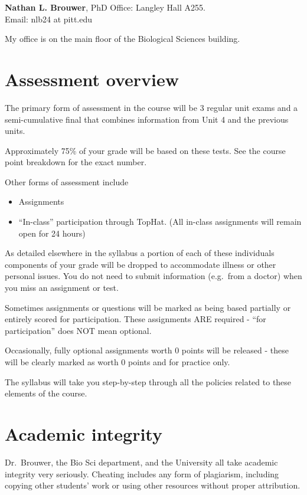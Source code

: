 \documentclass[
]{book}
\providecommand{\tightlist}{%
  \setlength{\itemsep}{0pt}\setlength{\parskip}{0pt}}
\begin{document}
\textbf{Nathan L. Brouwer}, PhD
Office: Langley Hall A255.\\
Email: nlb24 at pitt.edu

My office is on the main floor of the Biological Sciences building.

\hypertarget{assessment-overview}{%
\chapter{Assessment overview}\label{assessment-overview}}

The primary form of assessment in the course will be 3 regular unit exams and a semi-cumulative final that combines information from Unit 4 and the previous units.

Approximately 75\% of your grade will be based on these tests. See the course point breakdown for the exact number.

Other forms of assessment include

\begin{itemize}
\tightlist
\item
  Assignments
\item
  ``In-class'' participation through TopHat. (All in-class assignments will remain open for 24 hours)
\end{itemize}

As detailed elsewhere in the syllabus a portion of each of these individuals components of your grade will be dropped to accommodate illness or other personal issues. You do not need to submit information (e.g.~from a doctor) when you miss an assignment or test.

Sometimes assignments or questions will be marked as being based partially or entirely scored for participation. These assignments ARE required - ``for participation'' does NOT mean optional.

Occasionally, fully optional assignments worth 0 points will be released - these will be clearly marked as worth 0 points and for practice only.

The syllabus will take you step-by-step through all the policies related to these elements of the course.

\hypertarget{academic-integrity}{%
\chapter{Academic integrity}\label{academic-integrity}}

Dr.~Brouwer, the Bio Sci department, and the University all take academic integrity very seriously. Cheating includes any form of plagiarism, including copying other students' work or using other resources without proper attribution.
\end{document}
